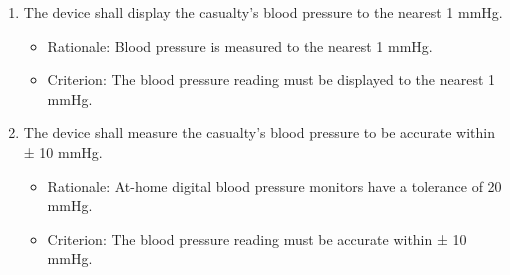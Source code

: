\documentclass{article}
\begin{document}
\begin{enumerate}[label = \textbf{{FR6.}\arabic*} ]
	    \item The device shall display the casualty's blood pressure to the nearest 1 mmHg.
	         \begin{itemize}
	            \item Rationale:  Blood pressure is measured to the nearest 1 mmHg. 
	            \item Criterion: The blood pressure reading must be displayed to the nearest 1 mmHg.
	        \end{itemize}
	        
	   \item The device shall measure the casualty's blood pressure to be accurate within ± 10 mmHg.
	        \begin{itemize}
	            \item Rationale: At-home digital blood pressure monitors have a tolerance of 20 mmHg.
	            \item Criterion: The blood pressure reading must be accurate within ± 10 mmHg.
	        \end{itemize}
        \end{enumerate}
\end{document}
